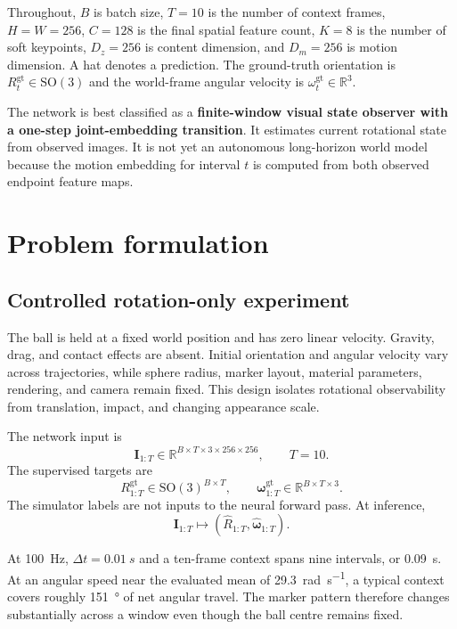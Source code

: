 \documentclass[11pt,a4paper]{article}
\newcommand{\R}{\mathbb R}
\newcommand{\SO}{\mathrm{SO}}
\newcommand{\vect}[1]{\mathbf{#1}}
\begin{document}
Throughout, $B$ is batch size, $T=10$ is the number of context frames, $H=W=256$, $C=128$ is the final spatial feature count, $K=8$ is the number of soft keypoints, $D_z=256$ is content dimension, and $D_m=256$ is motion dimension. A hat denotes a prediction. The ground-truth orientation is $R_t^{\mathrm{gt}}\in\SO(3)$ and the world-frame angular velocity is $\omega_t^{\mathrm{gt}}\in\R^3$.

\begin{interpretation}
The network is best classified as a \textbf{finite-window visual state observer with a one-step joint-embedding transition}. It estimates current rotational state from observed images. It is not yet an autonomous long-horizon world model because the motion embedding for interval $t$ is computed from both observed endpoint feature maps.
\end{interpretation}

\section{Problem formulation}
\subsection{Controlled rotation-only experiment}
The ball is held at a fixed world position and has zero linear velocity. Gravity, drag, and contact effects are absent. Initial orientation and angular velocity vary across trajectories, while sphere radius, marker layout, material parameters, rendering, and camera remain fixed. This design isolates rotational observability from translation, impact, and changing appearance scale.

The network input is
\begin{equation}
\vect I_{1:T}\in\R^{B\times T\times 3\times256\times256},\qquad T=10.
\end{equation}
The supervised targets are
\begin{equation}
R_{1:T}^{\mathrm{gt}}\in\SO(3)^{B\times T},\qquad
\vect\omega_{1:T}^{\mathrm{gt}}\in\R^{B\times T\times3}.
\end{equation}
The simulator labels are not inputs to the neural forward pass. At inference,
\begin{equation}
\vect I_{1:T}\longmapsto (\hat R_{1:T},\hat{\vect\omega}_{1:T}).
\end{equation}

At \SI{100}{Hz}, $\Delta t=\SI{0.01}{s}$ and a ten-frame context spans nine intervals, or \SI{0.09}{s}. At an angular speed near the evaluated mean of \SI{29.3}{\radian\per\second}, a typical context covers roughly \SI{151}{\degree} of net angular travel. The marker pattern therefore changes substantially across a window even though the ball centre remains fixed.
\end{document}
